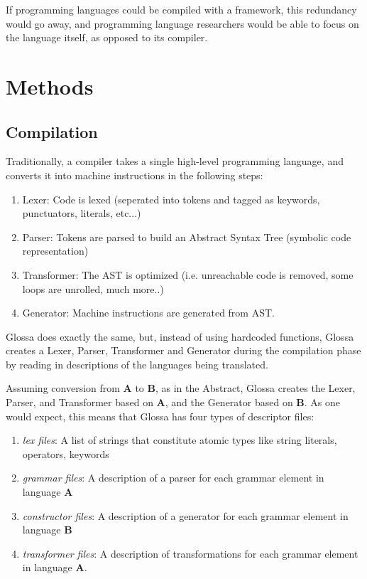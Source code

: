 \documentclass{article}
\begin{document}
If programming languages could be compiled with a framework, this redundancy would go away, and programming language researchers would be able to focus on the language itself, as opposed to its compiler.

\section{Methods}

\subsection{Compilation}
Traditionally, a compiler takes a single high-level programming language, and converts it into machine instructions in the following steps:
\begin{enumerate}
\item Lexer: Code is lexed (seperated into tokens and tagged as keywords, punctuators, literals, etc...)
\item Parser: Tokens are parsed to build an Abstract Syntax Tree (symbolic code representation)
\item Transformer: The AST is optimized (i.e. unreachable code is removed, some loops are unrolled, much more..)
\item Generator: Machine instructions are generated from AST.
\end{enumerate}

Glossa does exactly the same, but, instead of using hardcoded functions, Glossa creates a Lexer, Parser, Transformer and Generator during the compilation phase by reading in descriptions of the languages being translated.

Assuming conversion from \textbf{A} to \textbf{B}, as in the Abstract, Glossa creates the Lexer, Parser, and Transformer based on \textbf{A}, and the Generator based on \textbf{B}.
As one would expect, this means that Glossa has four types of descriptor files:

\begin{enumerate}
    \item \textit{lex files}: A list of strings that constitute atomic types like string literals, operators, keywords 
    \item \textit{grammar files}: A description of a parser for each grammar element in language \textbf{A} 
    \item \textit{constructor files}: A description of a generator for each grammar element in language \textbf{B}
    \item \textit{transformer files}: A description of transformations for each grammar element in language \textbf{A}.
\end{enumerate}
\end{document}

